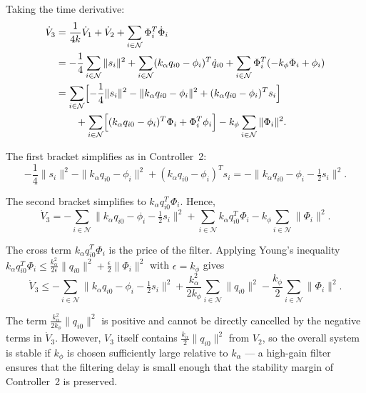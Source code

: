 Taking the time derivative:
\begin{align*}
	\dot{V}_3 &= \frac{1}{4k}\dot{V}_1 + \dot{V}_2 + \sum_{i\in\mathcal{N}} \Phi_i^T \dot{\Phi}_i \\
	&= -\frac14\sum_{i\in\mathcal{N}}\|s_i\|^2 + \sum_{i\in\mathcal{N}} (k_\alpha q_{i0} - \phi_i)^T \dot{q}_{i0}
	+ \sum_{i\in\mathcal{N}} \Phi_i^T(-k_\phi \Phi_i + \phi_i) \\
	&= \sum_{i\in\mathcal{N}} \Bigl[-\frac14\|s_i\|^2 - \|k_\alpha q_{i0} - \phi_i\|^2 + (k_\alpha q_{i0} - \phi_i)^T s_i\Bigr] \\
	&\qquad + \sum_{i\in\mathcal{N}} \Bigl[(k_\alpha q_{i0} - \phi_i)^T \Phi_i + \Phi_i^T \phi_i\Bigr]
	- k_\phi\sum_{i\in\mathcal{N}} \|\Phi_i\|^2.
\end{align*}

The first bracket simplifies as in Controller~2:
\begin{equation*}
	-\frac14\|s_i\|^2 - \|k_\alpha q_{i0} - \phi_i\|^2 + (k_\alpha q_{i0} - \phi_i)^T s_i
	= -\|k_\alpha q_{i0} - \phi_i - \tfrac12 s_i\|^2.
\end{equation*}

The second bracket simplifies to $k_\alpha q_{i0}^T\Phi_i$. Hence,
\begin{equation}\label{eq3:V3_dot}
	\dot{V}_3 = -\sum_{i\in\mathcal{N}} \|k_\alpha q_{i0} - \phi_i - \tfrac12 s_i\|^2
	+ \sum_{i\in\mathcal{N}} k_\alpha q_{i0}^T\Phi_i
	- k_\phi\sum_{i\in\mathcal{N}} \|\Phi_i\|^2.
\end{equation}

The cross term $k_\alpha q_{i0}^T\Phi_i$ is the price of the filter.
Applying Young's inequality $k_\alpha q_{i0}^T\Phi_i \leq \frac{k_\alpha^2}{2\epsilon}\|q_{i0}\|^2 + \frac{\epsilon}{2}\|\Phi_i\|^2$ with $\epsilon = k_\phi$ gives
\begin{equation}\label{eq3:V3_bound}
	\dot{V}_3 \leq -\sum_{i\in\mathcal{N}} \|k_\alpha q_{i0} - \phi_i - \tfrac12 s_i\|^2
	+ \frac{k_\alpha^2}{2k_\phi}\sum_{i\in\mathcal{N}} \|q_{i0}\|^2
	- \frac{k_\phi}{2}\sum_{i\in\mathcal{N}} \|\Phi_i\|^2.
\end{equation}

The term $\frac{k_\alpha^2}{2k_\phi}\|q_{i0}\|^2$ is positive and cannot be directly cancelled by the negative terms in $\dot{V}_3$.
However, $V_3$ itself contains $\frac{k_\alpha}{2}\|q_{i0}\|^2$ from $V_2$, so the overall system is stable if
$k_\phi$ is chosen sufficiently large relative to $k_\alpha$ --- a high-gain filter ensures that the
filtering delay is small enough that the stability margin of Controller~2 is preserved.

